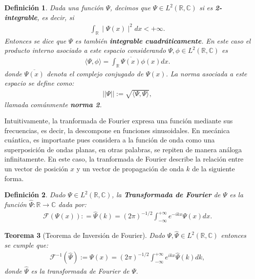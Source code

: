 \documentclass[12pt]{article}
\newtheorem{teo}{Teorema}[section]
\newtheorem{defn}[teo]{Definición}
\theoremstyle{definition}
\newcommand*{\field}[1]{\mathbb{#1}}
\begin{document}
\begin{defn}
    Dada una función $\Psi$, decimos que $\Psi \in L^{2}(\field{R},\field{C})$ si es \textbf{2-integrable}, es decir, si
    \begin{align*}
        \int_{\field{R}} \mid \Psi(x)\mid^2 dx < +\infty.
    \end{align*}
    Entonces se dice que $\Psi$ es también \textbf{integrable cuadráticamente}. En este caso el producto interno asociado a este espacio considerando $\Psi,\phi \in L^{2}(\field{R},\field{C})$ es
    \begin{align*}
        \langle\Psi,\phi \rangle = \int_{\field{R}} \overline{\Psi(x)}\phi(x)dx.
    \end{align*}
    donde $\overline{\Psi(x)}$ denota el complejo conjugado de $\Psi(x)$. La norma asociada a este espacio se define como:
    \begin{align*}
        ||\Psi|| := \sqrt{\langle\Psi,\Psi\rangle},
    \end{align*}
    llamada comúnmente \textbf{norma 2}.
    \label{def:espacioL2}
\end{defn}
\noindent
Intuitivamente, la tranformada de Fourier expresa una función mediante sus frecuencias, es decir, la descompone en funciones sinusoidales. En mecánica cuántica, es importante pues considera a la función de onda como una superposición de ondas planas, en otras palabras, se repiten de manera análoga infinitamente. En este caso, la tranformada de Fourier describe la relación entre un vector de posición $x$ y un vector de propagación de onda $k$ de la siguiente forma.
\begin{defn}
    Dado $\Psi \in L^{2}(\field{R},\field{C})$, la \textbf{Transformada de Fourier} de $\Psi$ es la función $\hat{\Psi} :\field{R}\rightarrow\field{C}$ dada por:
    \begin{align*}
        \mathcal{F}(\Psi(x)): =
        \hat{\Psi}(k) = (2\pi)^{-1/2}\int^{+\infty}_{-\infty}e^{-ikx}\Psi(x) dx.
    \end{align*}
    \label{def:TIFourier}
\end{defn}
\begin{teo}[Teorema de Inversión de Fourier]
    Dado $\Psi, \hat{\Psi} \in L^{2}(\field{R},\field{C})$ entonces se cumple que:
    \begin{align*}
        \mathcal{F}^{-1}(\hat{\Psi}):= 
        \Psi(x) = (2\pi)^{-1/2}\int^{+\infty}_{-\infty}e^{ikx}\hat{\Psi}(k) dk,
    \end{align*}
    donde $\hat{\Psi}$ es la transformada de Fourier de $\Psi$.
    \label{teo:InvFourier}
\end{teo}
\end{document}

